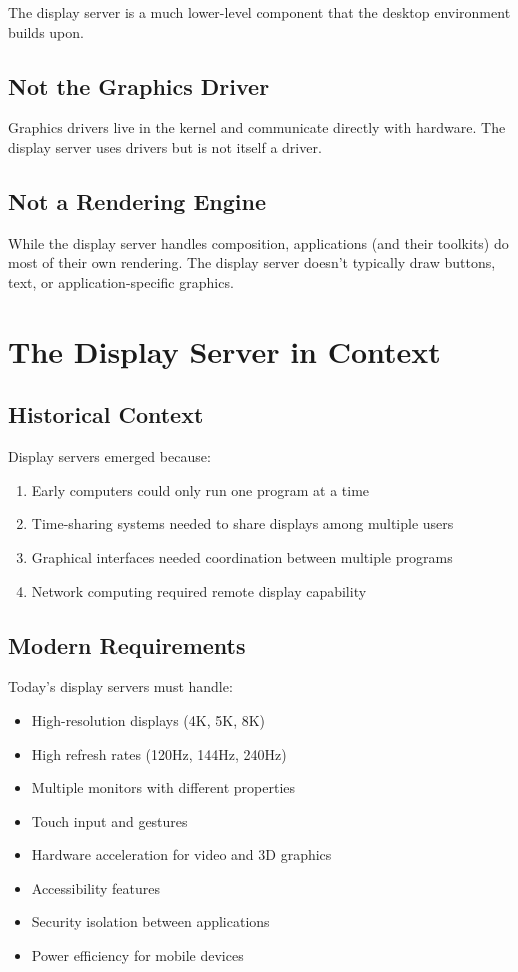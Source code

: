 The display server is a much lower-level component that the desktop environment builds upon.

\subsection{Not the Graphics Driver}

Graphics drivers live in the kernel and communicate directly with hardware. The display server uses drivers but is not itself a driver.

\subsection{Not a Rendering Engine}

While the display server handles composition, applications (and their toolkits) do most of their own rendering. The display server doesn't typically draw buttons, text, or application-specific graphics.

\section{The Display Server in Context}

\subsection{Historical Context}

Display servers emerged because:

\begin{enumerate}[leftmargin=*]
    \item Early computers could only run one program at a time
    \item Time-sharing systems needed to share displays among multiple users
    \item Graphical interfaces needed coordination between multiple programs
    \item Network computing required remote display capability
\end{enumerate}

\subsection{Modern Requirements}

Today's display servers must handle:

\begin{itemize}[leftmargin=*]
    \item High-resolution displays (4K, 5K, 8K)
    \item High refresh rates (120Hz, 144Hz, 240Hz)
    \item Multiple monitors with different properties
    \item Touch input and gestures
    \item Hardware acceleration for video and 3D graphics
    \item Accessibility features
    \item Security isolation between applications
    \item Power efficiency for mobile devices
\end{itemize}

